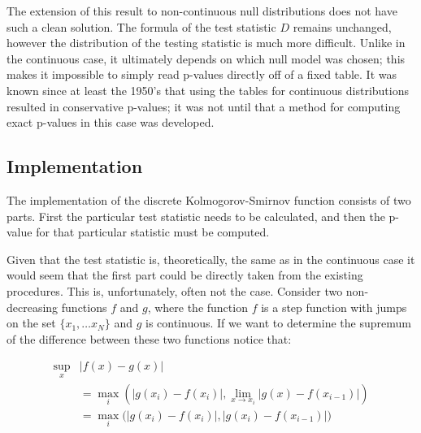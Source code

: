 The extension of this result to non-continuous null distributions does not have such a clean solution. The formula of
the test statistic $D$ remains unchanged, however the distribution of the testing statistic is much more difficult. Unlike in the 
continuous case, it ultimately depends on which null model was chosen; this makes it impossible to simply read p-values directly 
off of a fixed table. It was known since at least the 1950's that using the tables for continuous distributions resulted in 
conservative p-values; it was not until \citet{Conover1972} that a method for computing exact p-values in this case was developed.

\subsection{Implementation}

The implementation of the discrete Kolmogorov-Smirnov function consists of two parts. First the particular test statistic needs to be calculated,
and then the p-value for that particular statistic must be computed. 

Given that the test statistic is, theoretically, the same as in the
continuous case it would seem that the first part could be directly taken from the existing procedures. This is, unfortunately, often not the case.
Consider two non-decreasing functions $f$ and $g$, where the function $f$ is a step function with jumps on the set $\{x_1, \ldots x_N \}$ and $g$
is continuous. If we want to determine the supremum of the difference between these two functions notice that:

\begin{align*}
\sup_x &\left| f(x)- g(x) \right|   \\
       &= \max_i \left( \left|g(x_i) - f(x_i) \right|, \lim_{x \rightarrow x_i} \left| g(x) - f(x_{i-1}) \right| \right) \\
&=  \max_i \bigg( \left|g(x_i) - f(x_i) \right|, \left| g(x_i) - f(x_{i-1}) \right| \bigg)
\end{align*}

